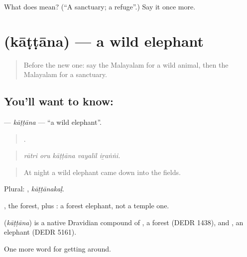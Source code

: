 \begin{tcolorbox}[breakable,colback=teal!4,colframe=teal!35!black,title={Before you move on}]
What does  mean? (\textquotedblleft{}A sanctuary; a refuge\textquotedblright{}.) Say it once more.
\end{tcolorbox}
\section[\texorpdfstring{\ml{കാട്ടാന} (kāṭṭāna)}{കാട്ടാന (kāṭṭāna)}]{ (kāṭṭāna) — a wild elephant}

\label{lesson:ML-C499-kattana}



\begin{quote}
Before the new one: say the Malayalam for a wild animal, then the Malayalam for a sanctuary.
\end{quote}

\subsection*{You'll want to know: }
\textbf{} — \emph{kāṭṭāna} — \textquotedblleft{}a wild elephant\textquotedblright{}.

\begin{quote}
    .
\end{quote}

\begin{quote}
\emph{rātri oru kāṭṭāna vayalil iṟaṅṅi.}
\end{quote}

\begin{quote}
At night a wild elephant came down into the fields.
\end{quote}

Plural: , \emph{kāṭṭānakaḷ}.

, the forest, plus : a forest elephant, not a temple one.

\begin{cousinweb}
\textbf{} (\emph{kāṭṭāna}) is a native Dravidian compound of , a forest (DEDR 1438), and , an elephant (DEDR 5161).
\end{cousinweb}

\begin{grammarlens}[title={What you've built}]
One more word for getting around.
\end{grammarlens}

